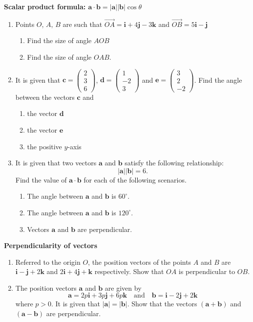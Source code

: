 \documentclass[a4paper,11pt,oneside]{book}
\providecommand{\vv}[1]{\overrightarrow{#1}}\providecommand{\cvv}[3]{\begin{pmatrix}#1\\#2\\#3\end{pmatrix}}
\newcounter{wq}[section]
\newcommand{\Q}[1]{\par\needspace{5\baselineskip}\medskip\stepcounter{wq}\noindent\textbf{\thewq}\quad #1\par}
\begin{document}
\Q{\textbf{Scalar product formula: $\mathbf a\cdot\mathbf b=|\mathbf a||\mathbf b|\cos\theta$}\par\smallskip \begin{enumerate}[label=(\alph*)]
\item Points $O$, $A$, $B$ are such that $\vv{OA}=\mathbf i+4\mathbf j-3\mathbf k$ and $\vv{OB}=5\mathbf i-\mathbf j$
\begin{enumerate}[label=(\roman*)]
\item Find the size of angle $AOB$
\item Find the size of angle $OAB$.
\end{enumerate}
\item It is given that $\mathbf c=\cvv{2}{3}{6}$, $\mathbf d=\cvv{1}{-2}{3}$ and $\mathbf e=\cvv{3}{2}{-2}$. Find the angle between the vectors $\mathbf c$ and
\begin{enumerate}[label=(\roman*)]
\item the vector $\mathbf d$
\item the vector $\mathbf e$
\item the positive $y$-axis
\end{enumerate}
\item It is given that two vectors $\mathbf a$ and $\mathbf b$ satisfy the following relationship:
\[
|\mathbf a||\mathbf b|=6.
\]
Find the value of $\mathbf a\cdot\mathbf b$ for each of the following scenarios.
\begin{enumerate}[label=(\roman*)]
\item The angle between $\mathbf a$ and $\mathbf b$ is $60^\circ$.
\item The angle between $\mathbf a$ and $\mathbf b$ is $120^\circ$.
\item Vectors $\mathbf a$ and $\mathbf b$ are perpendicular.
\end{enumerate}
\end{enumerate}}
\Q{\textbf{Perpendicularity of vectors}\par\smallskip \begin{enumerate}[label=(\alph*)]
\item Referred to the origin $O$, the position vectors of the points $A$ and $B$ are $\mathbf i-\mathbf j+2\mathbf k$ and $2\mathbf i+4\mathbf j+\mathbf k$ respectively. Show that $OA$ is perpendicular to $OB$.
\item The position vectors $\mathbf a$ and $\mathbf b$ are given by
\[
\mathbf a=2p\mathbf i+3p\mathbf j+6p\mathbf k\quad\text{and}\quad\mathbf b=\mathbf i-2\mathbf j+2\mathbf k
\]
where $p>0$. It is given that $|\mathbf a|=|\mathbf b|$. Show that the vectors $(\mathbf a+\mathbf b)$ and $(\mathbf a-\mathbf b)$ are perpendicular.
\end{enumerate}}
\end{document}

